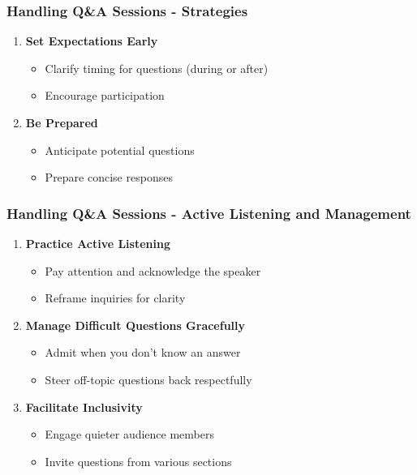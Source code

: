 \documentclass[aspectratio=169]{beamer}
\begin{document}
\begin{frame}[fragile]
    \frametitle{Handling Q\&A Sessions - Strategies}
    \begin{enumerate}
        \item \textbf{Set Expectations Early}
            \begin{itemize}
                \item Clarify timing for questions (during or after)
                \item Encourage participation
            \end{itemize}

        \item \textbf{Be Prepared}
            \begin{itemize}
                \item Anticipate potential questions
                \item Prepare concise responses
            \end{itemize}
    \end{enumerate}
\end{frame}

\begin{frame}[fragile]
    \frametitle{Handling Q\&A Sessions - Active Listening and Management}
    \begin{enumerate}[resume]
        \item \textbf{Practice Active Listening}
            \begin{itemize}
                \item Pay attention and acknowledge the speaker
                \item Reframe inquiries for clarity
            \end{itemize}

        \item \textbf{Manage Difficult Questions Gracefully}
            \begin{itemize}
                \item Admit when you don’t know an answer
                \item Steer off-topic questions back respectfully
            \end{itemize}
        
        \item \textbf{Facilitate Inclusivity}
            \begin{itemize}
                \item Engage quieter audience members
                \item Invite questions from various sections
            \end{itemize}
    \end{enumerate}
\end{frame}
\end{document}
